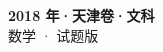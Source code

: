 \documentclass[zihao=-4, a4paper]{ctexart}
\begin{document}
\begin{center}
  {\Large\bfseries 2018 年·天津卷·文科}\\[4pt]
  {\large 数学 · 试题版}
\end{center}
\medskip
{}

\end{document}

